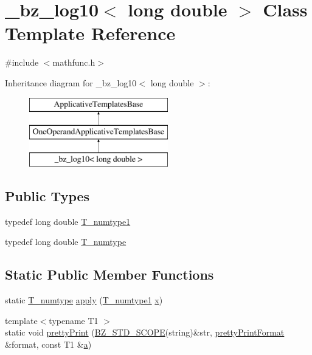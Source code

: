 \hypertarget{class__bz__log10_3_01long_01double_01_4}{}\section{\+\_\+bz\+\_\+log10$<$ long double $>$ Class Template Reference}
\label{class__bz__log10_3_01long_01double_01_4}


{\ttfamily \#include $<$mathfunc.\+h$>$}

Inheritance diagram for \+\_\+bz\+\_\+log10$<$ long double $>$\+:\begin{figure}[H]
\begin{center}
\leavevmode
\includegraphics[height=3.000000cm]{class__bz__log10_3_01long_01double_01_4}
\end{center}
\end{figure}
\subsection*{Public Types}
\begin{DoxyCompactItemize}
\item 
typedef long double \hyperlink{class__bz__log10_3_01long_01double_01_4_a3f4fa14b126f9681777061933646c3dc}{T\+\_\+numtype1}
\item 
typedef long double \hyperlink{class__bz__log10_3_01long_01double_01_4_aa30eed729722f9b8753bc7a763628673}{T\+\_\+numtype}
\end{DoxyCompactItemize}
\subsection*{Static Public Member Functions}
\begin{DoxyCompactItemize}
\item 
static \hyperlink{class__bz__log10_3_01long_01double_01_4_aa30eed729722f9b8753bc7a763628673}{T\+\_\+numtype} \hyperlink{class__bz__log10_3_01long_01double_01_4_a14f9b42b74f51ae9d4df201bb0f1645b}{apply} (\hyperlink{class__bz__log10_3_01long_01double_01_4_a3f4fa14b126f9681777061933646c3dc}{T\+\_\+numtype1} \hyperlink{vecnorm1_8cc_ac73eed9e41ec09d58f112f06c2d6cb63}{x})
\item 
{\footnotesize template$<$typename T1 $>$ }\\static void \hyperlink{class__bz__log10_3_01long_01double_01_4_af7716d45e682bbfaebcfc0f293f78859}{pretty\+Print} (\hyperlink{numinquire_8h_a2b24ffc3b4ef9803956bc7715c6c7b83}{B\+Z\+\_\+\+S\+T\+D\+\_\+\+S\+C\+O\+P\+E}(string)\&str, \hyperlink{classprettyPrintFormat}{pretty\+Print\+Format} \&format, const T1 \&\hyperlink{gen__mat5files_8m_aae328bf20413f220e38aec4d95bfd6da}{a})
\end{DoxyCompactItemize}


